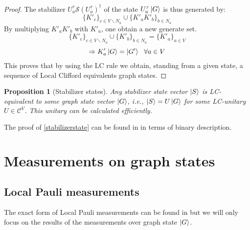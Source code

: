 \documentclass[10pt,a4paper]{book}
\numberwithin{equation}{chapter}
\numberwithin{figure}{chapter}
\numberwithin{table}{chapter}
\newtheorem{prop}{Proposition}[section]
\begin{document}
\begin{proof}
The stabilizer $U^{\tau}_{a}\mathcal{S}(U^{\tau}_{a})^{\dagger}$ of the state $U^{\tau}_{a}\ket{G}$ is thus generated by:
\begin{equation}
\lbrace K'_{c} \rbrace_{c \in V\backslash N_{a}} \cup \lbrace K'_{a} K'_{b} \rbrace_{b \in N_{a}} 
\end{equation}
By multiplying $K'_{a} K'_{b}$ with $K'_{a}$, one obtain a new generate set.
\begin{equation}
\lbrace K'_{c} \rbrace_{c \in V\backslash N_{a}} \cup \lbrace K'_{b} \rbrace_{b \in N_{a}} = \lbrace K'_{a} \rbrace_{a \in V}
\end{equation}
\begin{equation}
\Rightarrow K'_{a}\ket{G}=\ket{G'} \ \ \forall a \in V  
\end{equation}
This proves that by using the LC rule we obtain, standing from  a given state, a sequence of Local Clifford equivalents graph states.
\end{proof}

\begin{prop}[Stabilizer states] Any stabilizer state vector $\ket{S}$ is LC-equivalent to some graph state vector $\ket{G}$, i.e., $\ket{S}=U\ket{G}$ for some LC-unitary $U \in \mathcal{C}^V$. This unitary can be calculated efficiently.
\label{stabilizerstate}
\end{prop}
The proof of \autoref{stabilizerstate} can be found in \cite{GraphDescLC} in terms of binary description.

\section{Measurements on graph states}

\subsection{Local Pauli measurements}
The exact form of Local Pauli measurements can be found in \cite{MPEnGS} but  we will only focus on the results of the measurements over graph state $\ket{G}$.
\end{document}
